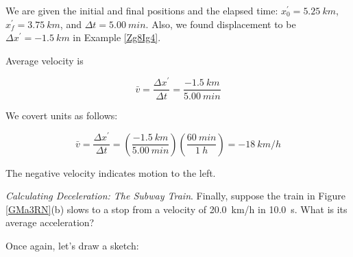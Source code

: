 \documentclass[main-ap-physics.tex]{subfiles}
\begin{document}
We are given the initial and final positions and the elapsed time: $x_0^{\prime} = \SI{5.25}{km}$, $x_f^{\prime} = \SI{3.75}{km}$, and $\Delta t = \SI{5.00}{min}$. Also, we found displacement to be $\Delta x^{\prime} = -\SI{1.5}{km}$ in Example \ref{Zg8Ig4}. 

\vspace{1em}

Average velocity is

\begin{equation*}
    \bar{v} = \frac{\Delta x^{\prime}}{\Delta t} = \frac{-\SI{1.5}{km}}{\SI{5.00}{min}} 
\end{equation*}

We covert units as follows:

\begin{equation*}
    \bar{v} = \frac{\Delta x^{\prime}}{\Delta t} = \left(\frac{-\SI{1.5}{km}}{\SI{5.00}{min}}\right)
        \left(\frac{\SI{60}{min}}{\SI{1}{h}}\right) = -\SI{18}{km/h}
\end{equation*}

The negative velocity indicates motion to the left.

\endsolution

\begin{example} \label{2453yE}
    \textit{Calculating Deceleration: The Subway Train}. Finally, suppose the train in Figure \ref{GMa3RN}(b) slows to a stop from a velocity of \SI{20.0}{km/h} in \SI{10.0}{s}. What is its average acceleration?
\end{example}

\Solution Once again, let's draw a sketch:

\begin{center}
\end{center}
\end{document}

